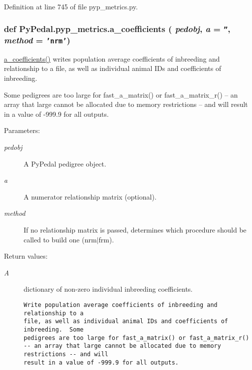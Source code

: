 Definition at line 745 of file pyp\_\-metrics.py.\hypertarget{namespacePyPedal_1_1pyp__metrics_e298ad3dcbaf85dc2cbf946d188a5265}{
\subsubsection[a\_\-coefficients]{\setlength{\rightskip}{0pt plus 5cm}def Py\-Pedal.pyp\_\-metrics.a\_\-coefficients ( {\em pedobj},  {\em a} = {\tt ''},  {\em method} = {\tt 'nrm'})}}
\label{namespacePyPedal_1_1pyp__metrics_e298ad3dcbaf85dc2cbf946d188a5265}


\hyperlink{namespacePyPedal_1_1pyp__metrics_e298ad3dcbaf85dc2cbf946d188a5265}{a\_\-coefficients()} writes population average coefficients of inbreeding and relationship to a file, as well as individual animal IDs and coefficients of inbreeding. 

Some pedigrees are too large for fast\_\-a\_\-matrix() or fast\_\-a\_\-matrix\_\-r() -- an array that large cannot be allocated due to memory restrictions -- and will result in a value of -999.9 for all outputs. \begin{Desc}
\item[Parameters:]
\begin{description}
\item[{\em pedobj}]A Py\-Pedal pedigree object. \item[{\em a}]A numerator relationship matrix (optional). \item[{\em method}]If no relationship matrix is passed, determines which procedure should be called to build one (nrm$|$frm). \end{description}
\end{Desc}
\begin{Desc}
\item[Return values:]
\begin{description}
\item[{\em A}]dictionary of non-zero individual inbreeding coefficients.

\footnotesize\begin{verbatim}Write population average coefficients of inbreeding and relationship to a
file, as well as individual animal IDs and coefficients of inbreeding.  Some
pedigrees are too large for fast_a_matrix() or fast_a_matrix_r()
-- an array that large cannot be allocated due to memory restrictions -- and will
result in a value of -999.9 for all outputs.
\end{verbatim}
\normalsize
 \end{description}
\end{Desc}


